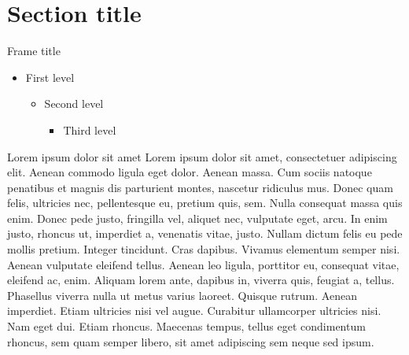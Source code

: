 \section{Section title}

\begin{frame}{Frame title}
  \begin{itemize}
    \item First level
    \begin{itemize}
      \item Second level
      \begin{itemize}
      \item Third level
    \end{itemize}
  \end{itemize}
\end{itemize}
\end{frame}

\begin{frame}{Lorem ipsum dolor sit amet}
Lorem ipsum dolor sit amet, consectetuer adipiscing elit. Aenean commodo ligula eget dolor. Aenean massa. Cum sociis natoque penatibus et magnis dis parturient montes, nascetur ridiculus mus. Donec quam felis, ultricies nec, pellentesque eu, pretium quis, sem. Nulla consequat massa quis enim. Donec pede justo, fringilla vel, aliquet nec, vulputate eget, arcu. In enim justo, rhoncus ut, imperdiet a, venenatis vitae, justo. Nullam dictum felis eu pede mollis pretium. Integer tincidunt. Cras dapibus. Vivamus elementum semper nisi. Aenean vulputate eleifend tellus. Aenean leo ligula, porttitor eu, consequat vitae, eleifend ac, enim. Aliquam lorem ante, dapibus in, viverra quis, feugiat a, tellus. Phasellus viverra nulla ut metus varius laoreet. Quisque rutrum. Aenean imperdiet. Etiam ultricies nisi vel augue. Curabitur ullamcorper ultricies nisi. Nam eget dui. Etiam rhoncus. Maecenas tempus, tellus eget condimentum rhoncus, sem quam semper libero, sit amet adipiscing sem neque sed ipsum.
\end{frame}

